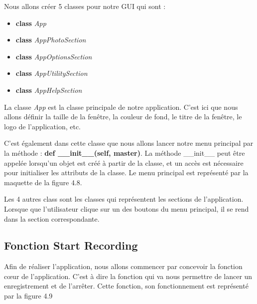             \begin{flushleft}
                Nous allons créer 5 classes pour notre GUI qui sont :
                \begin{itemize}
                    \item \textbf{class} \textit{App}
                    \item \textbf{class} \textit{AppPhotoSection}
                    \item \textbf{class} \textit{AppOptionsSection}
                    \item \textbf{class} \textit{AppUtilitySection}
                    \item \textbf{class} \textit{AppHelpSection}
                \end{itemize}                            
            \end{flushleft}

            La classe \textit{App} est la classe principale de notre application.
            C'est ici que nous allons définir la taille de la fenêtre, la couleur de fond, le titre de la fenêtre, le logo de l'application, etc.

            \vspace{0.2cm}

            C'est également dans cette classe que nous allons lancer notre menu principal par la méthode : \textbf{def \_\_init\_\_(self, master)}. La méthode \_\_init\_\_ peut être appelée lorsqu'un objet est créé à partir de la classe, et un accès est nécessaire pour initialiser les attributs de la classe. Le menu principal est représenté par la maquette de la figure 4.8.

            \vspace{0.2cm}

            Les 4 autres class sont les classes qui représentent les sections de l'application.
            Lorsque que l'utilisateur clique sur un des boutons du menu principal, il se rend dans la section correspondante.
        
        \subsection{Fonction Start Recording}
            Afin de réaliser l'application, nous allons commencer par concevoir la fonction cœur de l'application.
            C'est à dire la fonction qui va nous permettre de lancer un enregistrement et de l'arrêter.    
            Cette fonction, son fonctionnement est représenté par la figure 4.9


